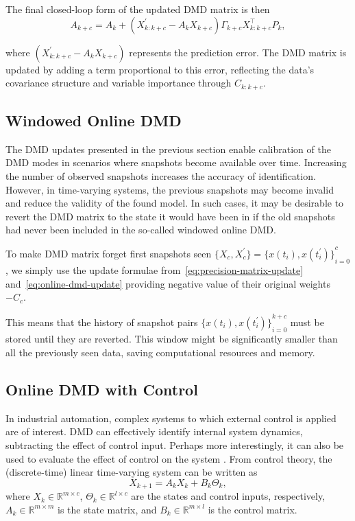 The final closed-loop form of the updated DMD matrix is then
\begin{equation}\label{eq:online-dmd-update}
    A_{k+c} = A_k + (X^\prime_{k : k+c} - A_k X_{k+c}) \Gamma_{k+c} X_{k : k+c}^\top P_k,
\end{equation}

where \((X^\prime_{k : k+c} - A_k X_{k+c})\) represents the prediction error. The DMD matrix is updated by adding a term proportional to this error, reflecting the data's covariance structure and variable importance through \(C_{k: k + c}\).

\subsection{Windowed Online DMD}
The DMD updates presented in the previous section enable calibration of the DMD modes in scenarios where snapshots become available over time. Increasing the number of observed snapshots increases the accuracy of identification. However, in time-varying systems, the previous snapshots may become invalid and reduce the validity of the found model. In such cases, it may be desirable to revert the DMD matrix to the state it would have been in if the old snapshots had never been included in the so-called windowed online DMD\@.

To make DMD matrix forget first snapshots seen \( \{X_{c}, X^\prime_{c}\} = {\{x(t_i), x(t_i^\prime )\}}^c_{i=0}\), we simply use the update formulae from~\eqref{eq:precision-matrix-update} and~\eqref{eq:online-dmd-update} providing negative value of their original weights \(-C_{c}\).

This means that the history of snapshot pairs \({\{x(t_i), x(t_i^\prime )\}}^{k+c}_{i=0}\) must be stored until they are reverted. This window might be significantly smaller than all the previously seen data, saving computational resources and memory.


\subsection{Online DMD with Control}
In industrial automation, complex systems to which external control is applied are of interest. DMD can effectively identify internal system dynamics, subtracting the effect of control input. Perhaps more interestingly, it can also be used to evaluate the effect of control on the system \citep{Proctor2016}. From control theory, the (discrete-time) linear time-varying system can be written as
\begin{equation}\label{eq:linear-system}
    X_{k+1} = A_k X_{k} + B_k \Theta_{k},
\end{equation}
where \(X_k \in \mathbb{R}^{m \times c}\), \(\Theta_k \in \mathbb{R}^{l \times c}\) are the states and control inputs, respectively, \(A_k \in \mathbb{R}^{m \times m}\) is the state matrix, and \(B_k \in \mathbb{R}^{m \times l}\) is the control matrix.

